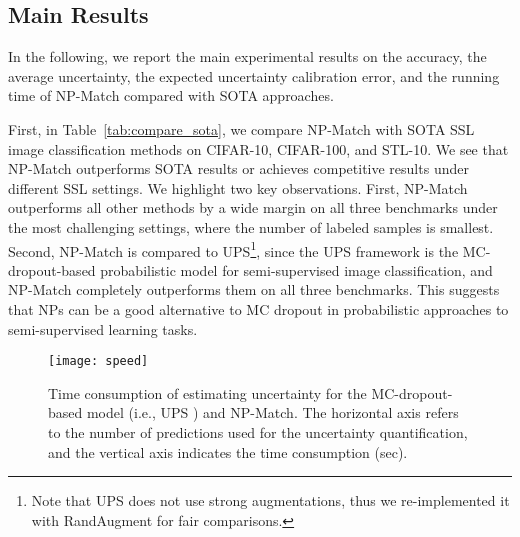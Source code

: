 \documentclass[nohyperref]{article}
\theoremstyle{plain}
\theoremstyle{definition}
\theoremstyle{remark}
\begin{document}
\begin{table}
\centering 
{}\vspace*{-1ex}
 \caption{Expected UCEs (\%) of the MC-dropout-based model (i.e., UPS \cite{rizve2021defense}) and of NP-Match on the test sets of CIFAR-10 and STL-10.}  
 \label{tab:ablation_uce} 
 \end{table}


\subsection{Main Results}
\label{sec:main_results} 
In the following, we report the main experimental results on the accuracy, 
the average uncertainty, the expected uncertainty calibration error, and the running time of NP-Match compared with SOTA approaches. 


First, in Table~\ref{tab:compare_sota}, we compare NP-Match with SOTA SSL image classification methods on CIFAR-10, CIFAR-100, and STL-10. We see that NP-Match outperforms SOTA results or achieves competitive results under different SSL settings. We highlight two key observations. First, NP-Match outperforms all other methods by a wide margin on all three benchmarks under the most challenging settings,  where the number of labeled samples is smallest.
Second, NP-Match is compared to  UPS\footnote{Note that UPS \cite{rizve2021defense} does not use strong augmentations, thus we re-implemented it with RandAugment \cite{cubuk2020randaugment} for fair comparisons.}, since the UPS framework is the MC-dropout-based probabilistic model for semi-supervised image classification, and NP-Match completely outperforms them on all three benchmarks. This suggests that NPs can be a good alternative to MC dropout in probabilistic approaches to semi-supervised learning tasks.
 
 \begin{figure}[t]
\centering
\texttt{[image: speed]}
\vspace{-5ex}
\caption{Time consumption of estimating uncertainty for the MC-dropout-based model (i.e., UPS \cite{rizve2021defense}) and  NP-Match. The horizontal axis refers to the number of predictions used for the uncertainty quantification, and the vertical axis indicates the time consumption (sec).} 
\label{fig:speed}
\end{figure}
\end{document}
